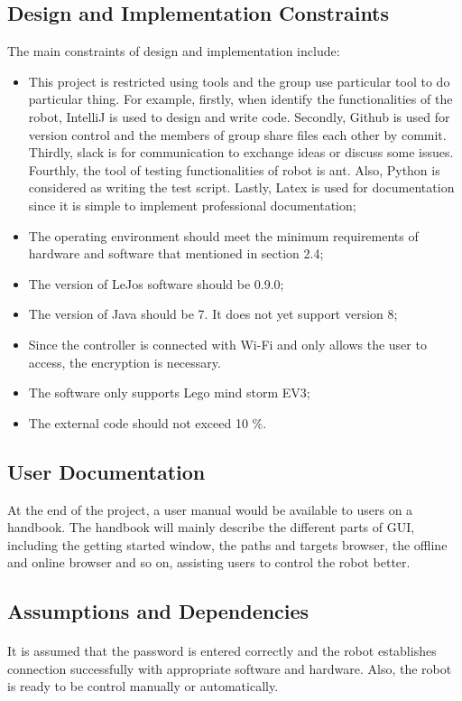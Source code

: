 \documentclass[10pt,a4paper,titlepage]{article}
\begin{document}
	\subsection{Design and Implementation Constraints}
The main constraints of design and implementation include:
	\begin{itemize}

	\item This project is restricted using tools and the group use particular tool to do particular thing. For example, firstly, when identify the functionalities of the robot, IntelliJ is used to design and write code. Secondly, Github is used for version control and the members of group share files each other by commit. Thirdly, slack is for communication to exchange ideas or discuss some issues. Fourthly, the tool of testing functionalities of robot is ant. Also, Python is considered as writing the test script. Lastly, Latex is used for documentation since it is simple to implement professional documentation;
	\item The operating environment should meet the minimum requirements of hardware and software that mentioned in section 2.4;
	\item The version of LeJos software should be 0.9.0;
	\item The version of Java should be 7. It does not yet support version 8;
	\item Since the controller is connected with Wi-Fi and only allows the user to access, the encryption is necessary.
	\item The software only supports Lego mind storm EV3;
	\item The external code should not exceed 10 \%.
	\end{itemize}
	\subsection{User Documentation}
At the end of the project, a user manual would be available to users on a handbook. The handbook will mainly describe the different parts of GUI, including the getting started window, the paths and targets browser, the offline and online browser and so on, assisting users to control the robot better.

	\subsection{Assumptions and Dependencies}
	\paragraph{}
It is assumed that the password is entered correctly and the robot establishes connection successfully with appropriate software and hardware. Also, the robot is ready to be control manually or automatically. 	
\end{document}
